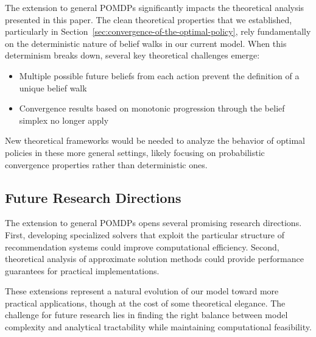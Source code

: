 The extension to general POMDPs significantly impacts the theoretical analysis presented in this paper. The clean theoretical properties that we established, particularly in Section~\ref{sec:convergence-of-the-optimal-policy}, rely fundamentally on the deterministic nature of belief walks in our current model. When this determinism breaks down, several key theoretical challenges emerge:

\begin{itemize}
    \item Multiple possible future beliefs from each action prevent the definition of a unique belief walk
    \item Convergence results based on monotonic progression through the belief simplex no longer apply
\end{itemize}

New theoretical frameworks would be needed to analyze the behavior of optimal policies in these more general settings, likely focusing on probabilistic convergence properties rather than deterministic ones.

\subsection{Future Research Directions}

The extension to general POMDPs opens several promising research directions. First, developing specialized solvers that exploit the particular structure of recommendation systems could improve computational efficiency. Second, theoretical analysis of approximate solution methods could provide performance guarantees for practical implementations.

These extensions represent a natural evolution of our model toward more practical applications, though at the cost of some theoretical elegance. The challenge for future research lies in finding the right balance between model complexity and analytical tractability while maintaining computational feasibility.